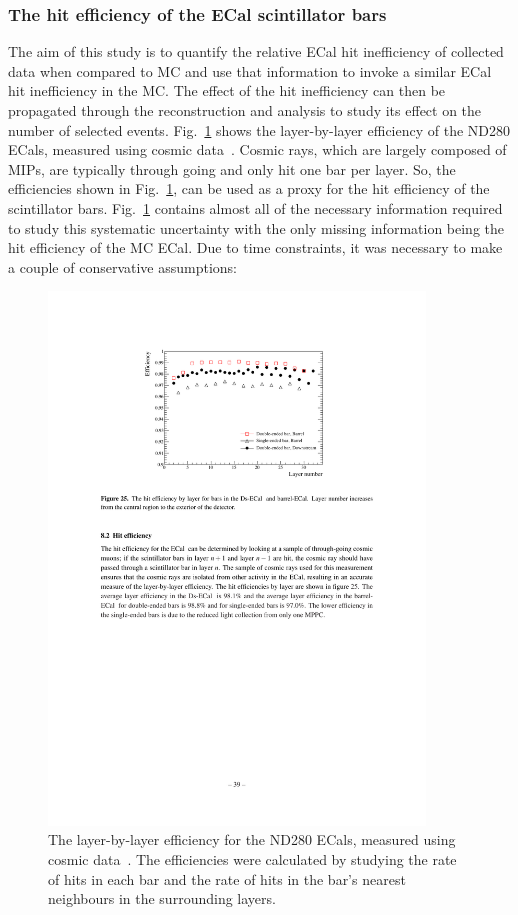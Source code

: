\subsubsection{The hit efficiency of the ECal scintillator bars}
The aim of this study is to quantify the relative ECal hit inefficiency of collected data when compared to MC and use that information to invoke a similar ECal hit inefficiency in the MC.  The effect of the hit inefficiency can then be propagated through the reconstruction and analysis to study its effect on the number of selected events.  Fig.~\ref{fig:LayerEfficiencyCosmicData} shows the layer-by-layer efficiency of the ND280 ECals, measured using cosmic data~\cite{1748-0221-8-10-P10019}.  Cosmic rays, which are largely composed of MIPs, are typically through going and only hit one bar per layer.  So, the efficiencies shown in Fig.~\ref{fig:LayerEfficiencyCosmicData}, can be used as a proxy for the hit efficiency of the scintillator bars.  Fig.~\ref{fig:LayerEfficiencyCosmicData} contains almost all of the necessary information required to study this systematic uncertainty with the only missing information being the hit efficiency of the MC ECal.  Due to time constraints, it was necessary to make a couple of conservative assumptions:
\begin{figure}[t!]
  \centering
  \includegraphics[width=10cm]{images/measurement/systematics/detector/threshold/layer_efficiency_cosmics_data.pdf}
  \caption{The layer-by-layer efficiency for the ND280 ECals, measured using cosmic data~\cite{1748-0221-8-10-P10019}.  The efficiencies were calculated by studying the rate of hits in each bar and the rate of hits in the bar's nearest neighbours in the surrounding layers.}
  \label{fig:LayerEfficiencyCosmicData}
\end{figure}
